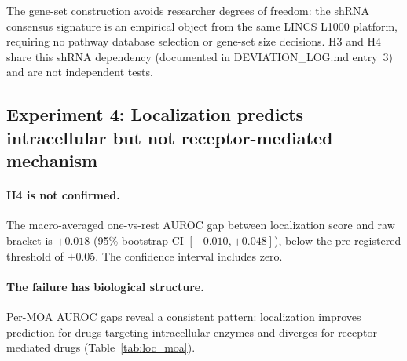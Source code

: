 \documentclass{article}
\begin{document}
The gene-set construction avoids researcher degrees of freedom: the shRNA
consensus signature is an empirical object from the same LINCS L1000
platform, requiring no pathway database selection or gene-set size
decisions. H3 and H4 share this shRNA dependency
(documented in DEVIATION\_LOG.md entry~3) and are not independent tests.

\subsection{Experiment 4: Localization predicts intracellular but not receptor-mediated mechanism}

\paragraph{H4 is not confirmed.}
The macro-averaged one-vs-rest AUROC gap between localization score and raw
bracket is $+0.018$ (95\% bootstrap CI $[-0.010, +0.048]$), below the
pre-registered threshold of $+0.05$. The confidence interval includes zero.

\paragraph{The failure has biological structure.}
Per-MOA AUROC gaps reveal a consistent pattern: localization improves
prediction for drugs targeting intracellular enzymes and diverges for
receptor-mediated drugs (Table~\ref{tab:loc_moa}).
\end{document}
